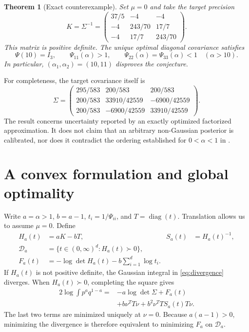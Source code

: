 \documentclass[11pt]{article}
\newtheorem{theorem}{Theorem}
\theoremstyle{remark}\newtheorem{remark}[theorem]{Remark}
\DeclareMathOperator{\diag}{diag}
\begin{document}
\begin{theorem}[Exact counterexample]\label{thm:counterexample}
Set $\mu=0$ and take the target precision
\begin{equation}\label{eq:K}
K=\Sigma^{-1}=
\begin{pmatrix}
37/5&-4&-4\\
-4&243/70&17/7\\
-4&17/7&243/70
\end{pmatrix}.
\end{equation}
This matrix is positive definite. The unique optimal diagonal covariance satisfies
\begin{equation}\label{eq:counterexample}
\Psi(10)=I_3,\qquad
\Psi_{11}(\alpha)>1,\qquad
\Psi_{22}(\alpha)=\Psi_{33}(\alpha)<1\quad(\alpha>10).
\end{equation}
In particular, $(\alpha_1,\alpha_2)=(10,11)$ disproves the conjecture.
\end{theorem}
For completeness, the target covariance itself is
\begin{equation}\label{eq:sigma}
\Sigma=\begin{pmatrix}
295/583&200/583&200/583\\
200/583&33910/42559&-6900/42559\\
200/583&-6900/42559&33910/42559
\end{pmatrix}.
\end{equation}
The result concerns uncertainty reported by an exactly optimized factorized approximation. It does not claim that an arbitrary non-Gaussian posterior is calibrated, nor does it contradict the ordering established for $0<\alpha<1$ in \cite{mps}.

\section{A convex formulation and global optimality}
Write $a=\alpha>1$, $b=a-1$, $t_i=1/\Psi_{ii}$, and $T=\diag(t)$. Translation allows us to assume $\mu=0$. Define
\begin{align}
H_a(t)&=aK-bT,&S_a(t)&=H_a(t)^{-1},\label{eq:H}\\
\mathcal D_a&=\{t\in(0,\infty)^d:H_a(t)\succ0\},\nonumber\\
F_a(t)&=-\log\det H_a(t)-b\sum_{i=1}^d\log t_i.\label{eq:F}
\end{align}
If $H_a(t)$ is not positive definite, the Gaussian integral in \eqref{eq:divergence} diverges. When $H_a(t)\succ0$, completing the square gives
\begin{equation}\label{eq:integral}
\begin{split}
2\log\!\int p^a q^{1-a}
={}&-a\log\det\Sigma+F_a(t)\\
&+b\nu^TT\nu+b^2\nu^TT S_a(t)T\nu.
\end{split}
\end{equation}
The last two terms are minimized uniquely at $\nu=0$. Because $a(a-1)>0$, minimizing the divergence is therefore equivalent to minimizing $F_a$ on $\mathcal D_a$.
\end{document}

